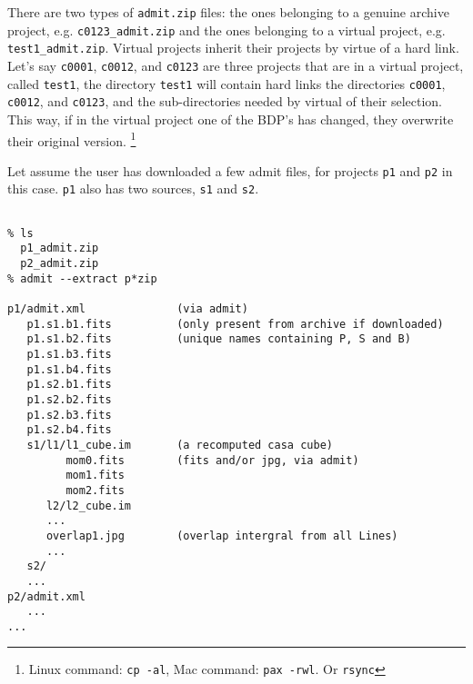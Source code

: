 \documentclass{article}
\begin{document}
There are two types of {\tt admit.zip} files: the ones belonging to a
genuine archive project, e.g.  {\tt c0123\_admit.zip} and the ones
belonging to a virtual project, e.g.  {\tt test1\_admit.zip}.  Virtual
projects inherit their projects by virtue of a hard link. Let's say
{\tt c0001}, {\tt c0012}, and {\tt c0123} are three projects that are
in a virtual project, called {\tt test1}, the directory {\tt test1}
will contain hard links the directories {\tt c0001}, {\tt c0012}, and
{\tt c0123}, and the sub-directories needed by virtual of their selection.
 This way, if in the virtual project one of the BDP's has
changed, they overwrite their original version. 
\footnote{Linux command: {\tt cp -al}, Mac command: {\tt pax -rwl}. Or {\tt rsync}}

Let assume the user has downloaded a few admit files, for projects 
{\tt p1} and {\tt p2} in this case. {\tt p1} also has two sources,
{\tt s1} and {\tt s2}.

\footnotesize
\begin{verbatim}

% ls
  p1_admit.zip
  p2_admit.zip
% admit --extract p*zip

p1/admit.xml              (via admit)
   p1.s1.b1.fits          (only present from archive if downloaded)
   p1.s1.b2.fits          (unique names containing P, S and B)
   p1.s1.b3.fits
   p1.s1.b4.fits
   p1.s2.b1.fits
   p1.s2.b2.fits
   p1.s2.b3.fits
   p1.s2.b4.fits
   s1/l1/l1_cube.im       (a recomputed casa cube)
         mom0.fits        (fits and/or jpg, via admit)
         mom1.fits
         mom2.fits
      l2/l2_cube.im
      ...
      overlap1.jpg        (overlap intergral from all Lines)
      ...
   s2/
   ...
p2/admit.xml
   ...
...

\end{verbatim}
\normalsize


%
%
%
%
%  
%
%
%
%
\end{document}
